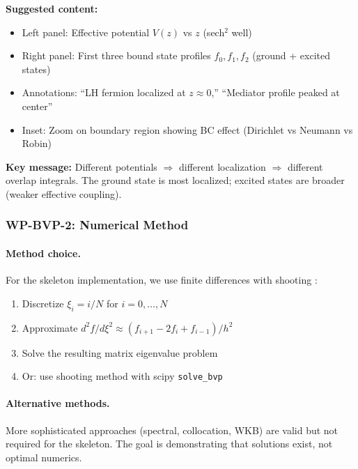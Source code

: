 \begin{tcolorbox}[colback=gray!10, colframe=gray!50, title=\textbf{Figure Placeholder 1: Potential and Bound State Profiles}]
\textbf{Suggested content:}
\begin{itemize}[nosep]
    \item Left panel: Effective potential $V(z)$ vs $z$ (sech$^2$ well)
    \item Right panel: First three bound state profiles $f_0, f_1, f_2$ (ground + excited states)
    \item Annotations: ``LH fermion localized at $z \approx 0$,'' ``Mediator profile peaked at center''
    \item Inset: Zoom on boundary region showing BC effect (Dirichlet vs Neumann vs Robin)
\end{itemize}
\textbf{Key message:} Different potentials $\Rightarrow$ different localization $\Rightarrow$
different overlap integrals. The ground state is most localized; excited states are
broader (weaker effective coupling).
\end{tcolorbox}

\subsubsection{WP-BVP-2: Numerical Method}
\label{sec:bvp_numerics}

\paragraph{Method choice.}
For the skeleton implementation, we use finite differences with shooting \tagP{}:
\begin{enumerate}[nosep]
    \item Discretize $\xi_i = i/N$ for $i = 0, \ldots, N$
    \item Approximate $d^2f/d\xi^2 \approx (f_{i+1} - 2f_i + f_{i-1})/h^2$
    \item Solve the resulting matrix eigenvalue problem
    \item Or: use shooting method with scipy \texttt{solve\_bvp}
\end{enumerate}

\paragraph{Alternative methods.}
More sophisticated approaches (spectral, collocation, WKB) are valid but not
required for the skeleton. The goal is demonstrating that solutions exist,
not optimal numerics.

